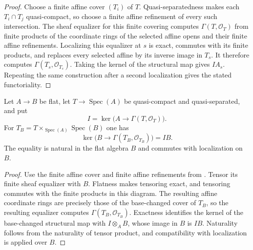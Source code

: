 \begin{proof}
  \leanok
  Choose a finite affine cover $(T_i)$ of $T$.  Quasi-separatedness makes
  each $T_i\cap T_j$ quasi-compact, so choose a finite affine refinement of
  every such intersection.  The sheaf equalizer for this finite covering
  computes $\Gamma(T,\mathcal O_T)$ from finite products of the coordinate
  rings of the selected affine opens and their finite affine refinements.
  Localizing this equalizer at $s$ is exact, commutes with its finite
  products, and replaces every selected affine by its inverse image in
  $T_s$.  It therefore computes $\Gamma(T_s,\mathcal O_{T_s})$.  Taking the
  kernel of the structural map gives $IA_s$.  Repeating the same construction
  after a second localization gives the stated functoriality.
\end{proof}

\begin{lemma}
  \label{lemma:nagata-affine-image-kernel-flat}
  \leanok

  Let $A\to B$ be flat, let $T\to\operatorname{Spec}(A)$ be quasi-compact
  and quasi-separated, and put
  \[
    I=\ker\bigl(A\longrightarrow\Gamma(T,\mathcal O_T)\bigr).
  \]
  For $T_B=T\times_{\operatorname{Spec}(A)}\operatorname{Spec}(B)$ one has
  \[
    \ker\bigl(B\longrightarrow\Gamma(T_B,\mathcal O_{T_B})\bigr)=IB.
  \]
  The equality is natural in the flat algebra $B$ and commutes with
  localization on $B$.
\end{lemma}

\begin{proof}
  \leanok
  Use the finite affine cover and finite affine refinements from
  .  Tensor its finite
  sheaf equalizer with $B$.  Flatness makes tensoring exact, and tensoring
  commutes with the finite products in this diagram.  The resulting affine
  coordinate rings are precisely those of the base-changed cover of $T_B$,
  so the resulting equalizer computes $\Gamma(T_B,\mathcal O_{T_B})$.
  Exactness identifies the kernel of the base-changed structural map with
  $I\otimes_A B$, whose image in $B$ is $IB$.  Naturality follows from the
  naturality of tensor product, and compatibility with localization is
   applied over $B$.
\end{proof}

